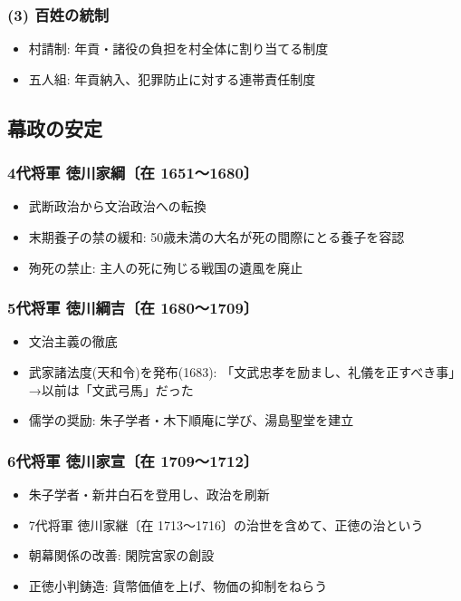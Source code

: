 \documentclass[a4paper,11pt]{jsarticle}
\begin{document}
\subsubsection*{(3) 百姓の統制}
\begin{itemize}
  \item 村請制: 年貢・諸役の負担を村全体に割り当てる制度
  \item 五人組: 年貢納入、犯罪防止に対する連帯責任制度
\end{itemize}

\subsection*{幕政の安定}
\subsubsection*{4代将軍 徳川家綱〔在 1651〜1680〕}
\begin{itemize}
  \item 武断政治から文治政治への転換
  \item 末期養子の禁の緩和: 50歳未満の大名が死の間際にとる養子を容認
  \item 殉死の禁止: 主人の死に殉じる戦国の遺風を廃止
\end{itemize}

\subsubsection*{5代将軍 徳川綱吉〔在 1680〜1709〕}
\begin{itemize}
  \item 文治主義の徹底
  \item 武家諸法度(天和令)を発布(1683): 「文武忠孝を励まし、礼儀を正すべき事」→以前は「文武弓馬」だった
  \item 儒学の奨励: 朱子学者・木下順庵に学び、湯島聖堂を建立
\end{itemize}

\subsubsection*{6代将軍 徳川家宣〔在 1709〜1712〕}
\begin{itemize}
  \item 朱子学者・新井白石を登用し、政治を刷新
  \item 7代将軍 徳川家継〔在 1713〜1716〕の治世を含めて、正徳の治という
  \item 朝幕関係の改善: 閑院宮家の創設
  \item 正徳小判鋳造: 貨幣価値を上げ、物価の抑制をねらう
\end{itemize}
\end{document}
